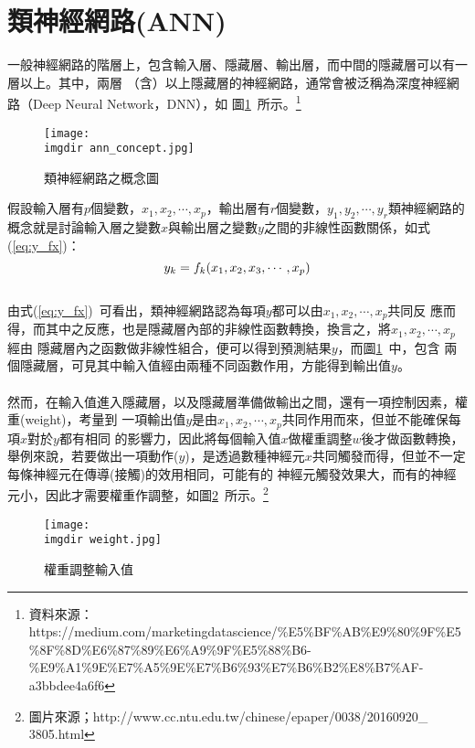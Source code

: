 	\section{類神經網路(ANN)}	
		一般神經網路的階層上，包含輸入層、隱藏層、輸出層，而中間的隱藏層可以有一層以上。其中，兩層			（含）以上隱藏層的神經網路，通常會被泛稱為深度神經網路（Deep Neural Network，DNN），如			圖\ref{fig:ann_concept}\ 所示。\footnote{資料來源：https://medium.com/marketingdatascience/\%E5\%BF\%AB\%E9\%80\%9F\%E5\%8F\%8D\%E6\%87\%89\%E6\%A9\%9F\%E5\%88\%B6-\%E9\%A1\%9E\%E7\%A5\%9E\%E7\%B6\%93\%E7\%B6\%B2\%E8\%B7\%AF-a3bbdee4a6f6}
		\begin{figure}[H]	
			\centering	 			 	 
   			\texttt{[image: \\imgdir ann\_concept.jpg]} 
   			\caption{類神經網路之概念圖}
   			\label{fig:ann_concept}   			 		 
		\end{figure}
		假設輸入層有$p$個變數，$x_1,x_2,\cdots,x_p$，輸出層有$r$個變數，$y_1,y_2,\cdots,y_r			$類神經網路的概念就是討論輸入層之變數$x$與輸出層之變數$y$之間的非線性函數關係，如式				(\ref{eq:y_fx})：
		\\
		\begin{equation}\label{eq:y_fx}
 				y_k = f_k(x_1,x_2,x_3,\cdots ,x_p)\\
 		\end{equation}
		\\
		由式(\ref{eq:y_fx})\ 可看出，類神經網路認為每項$y$都可以由$x_1,x_2,\cdots,x_p$共同反			應而得，而其中之反應，也是隱藏層內部的非線性函數轉換，換言之，將$x_1,x_2,\cdots,x_p$經由			隱藏層內之函數做非線性組合，便可以得到預測結果$y$，而圖\ref{fig:ann_concept}\ 中，包含			兩個隱藏層，可見其中輸入值經由兩種不同函數作用，方能得到輸出值$y$。
		\\
		\\
		然而，在輸入值進入隱藏層，以及隱藏層準備做輸出之間，還有一項控制因素，權重(weight)，考量到			一項輸出值$y$是由$x_1,x_2,\cdots,x_p$共同作用而來，但並不能確保每項$x$對於$y$都有相同			的影響力，因此將每個輸入值$x$做權重調整$w$後才做函數轉換，舉例來說，若要做出一項動作($y				$)，是透過數種神經元$x$共同觸發而得，但並不一定每條神經元在傳導(接觸)的效用相同，可能有的			神經元觸發效果大，而有的神經元小，因此才需要權重作調整，如圖\ref{fig:weight}\ 所示。\footnote{圖片來源；http://www.cc.ntu.edu.tw/chinese/epaper/0038/20160920\_ 3805.html}
		\begin{figure}[H]	
			\centering	 			 	 
   			\texttt{[image: \\imgdir weight.jpg]} 
   			\caption{權重調整輸入值}
   			\label{fig:weight}   			 		 
		\end{figure}
